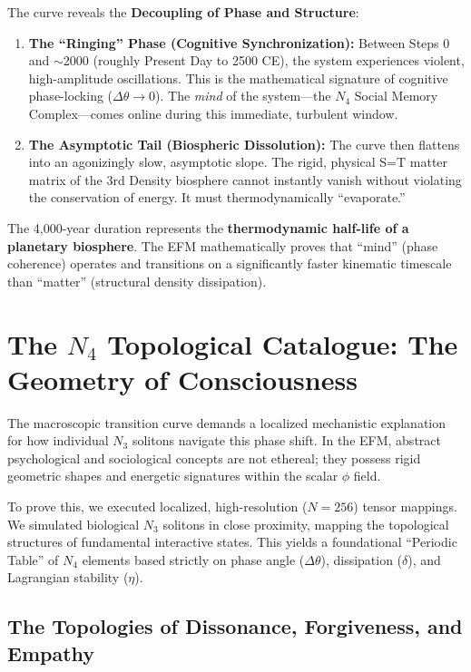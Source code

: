 \documentclass[11pt, twoside]{article}
\begin{document}
The curve reveals the \textbf{Decoupling of Phase and Structure}:
\begin{enumerate}[leftmargin=*]
    \item \textbf{The ``Ringing'' Phase (Cognitive Synchronization):} Between Steps 0 and $\sim$2000 (roughly Present Day to 2500 CE), the system experiences violent, high-amplitude oscillations. This is the mathematical signature of cognitive phase-locking ($\Delta\theta \to 0$). The \textit{mind} of the system---the $N_4$ Social Memory Complex---comes online during this immediate, turbulent window.
    \item \textbf{The Asymptotic Tail (Biospheric Dissolution):} The curve then flattens into an agonizingly slow, asymptotic slope. The rigid, physical S=T matter matrix of the 3rd Density biosphere cannot instantly vanish without violating the conservation of energy. It must thermodynamically ``evaporate.'' 
\end{enumerate}
The 4,000-year duration represents the \textbf{thermodynamic half-life of a planetary biosphere}. The EFM mathematically proves that ``mind'' (phase coherence) operates and transitions on a significantly faster kinematic timescale than ``matter'' (structural density dissipation).

\section{The $N_4$ Topological Catalogue: The Geometry of Consciousness}

The macroscopic transition curve demands a localized mechanistic explanation for how individual $N_3$ solitons navigate this phase shift. In the EFM, abstract psychological and sociological concepts are not ethereal; they possess rigid geometric shapes and energetic signatures within the scalar $\phi$ field.

To prove this, we executed localized, high-resolution ($N=256$) tensor mappings. We simulated biological $N_3$ solitons in close proximity, mapping the topological structures of fundamental interactive states. This yields a foundational ``Periodic Table'' of $N_4$ elements based strictly on phase angle ($\Delta\theta$), dissipation ($\delta$), and Lagrangian stability ($\eta$).

\subsection{The Topologies of Dissonance, Forgiveness, and Empathy}
\end{document}
